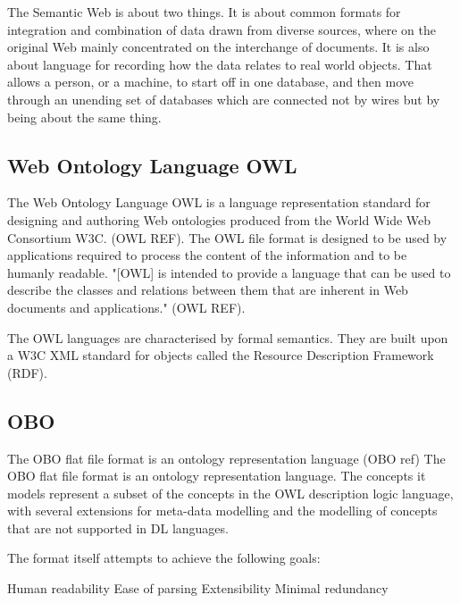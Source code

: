 The Semantic Web is about two things. It is about common formats for integration and combination of data drawn from diverse sources, where on the original Web mainly concentrated on the interchange of documents. It is also about language for recording how the data relates to real world objects. That allows a person, or a machine, to start off in one database, and then move through an unending set of databases which are connected not by wires but by being about the same thing.

\subsection{Web Ontology Language OWL}\label{owl}
The Web Ontology Language OWL is a language representation standard for designing and authoring Web ontologies produced from the World Wide Web Consortium W3C. (OWL REF). The OWL file format is designed to be used by applications required to process the content of the information and to be humanly readable. "[OWL] is intended to provide a language that can be used to describe the classes and relations between them that are inherent in Web documents and applications." (OWL REF). 

The OWL languages are characterised by formal semantics. They are built upon a W3C XML standard for objects called the Resource Description Framework (RDF).

\subsection{OBO}\label{obo}
The OBO flat file format is an ontology representation language (OBO ref) The OBO flat file format is an ontology representation language. The concepts it models represent a subset of the concepts in the OWL description logic language, with several extensions for meta-data modelling and the modelling of concepts that are not supported in DL languages.

The format itself attempts to achieve the following goals:

Human readability
Ease of parsing
Extensibility
Minimal redundancy


